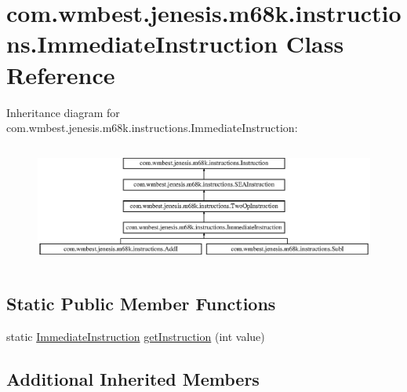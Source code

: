 \hypertarget{classcom_1_1wmbest_1_1jenesis_1_1m68k_1_1instructions_1_1ImmediateInstruction}{\section{com.\-wmbest.\-jenesis.\-m68k.\-instructions.\-Immediate\-Instruction Class Reference}
\label{classcom_1_1wmbest_1_1jenesis_1_1m68k_1_1instructions_1_1ImmediateInstruction}
}
Inheritance diagram for com.\-wmbest.\-jenesis.\-m68k.\-instructions.\-Immediate\-Instruction\-:\begin{figure}[H]
\begin{center}
\leavevmode
\includegraphics[height=4.011461cm]{classcom_1_1wmbest_1_1jenesis_1_1m68k_1_1instructions_1_1ImmediateInstruction}
\end{center}
\end{figure}
\subsection*{Static Public Member Functions}
\begin{DoxyCompactItemize}
\item 
static \hyperlink{classcom_1_1wmbest_1_1jenesis_1_1m68k_1_1instructions_1_1ImmediateInstruction}{Immediate\-Instruction} \hyperlink{classcom_1_1wmbest_1_1jenesis_1_1m68k_1_1instructions_1_1ImmediateInstruction_a5ad9ecb37c716bc4d8e877fa9fae76d8}{get\-Instruction} (int value)
\end{DoxyCompactItemize}
\subsection*{Additional Inherited Members}



